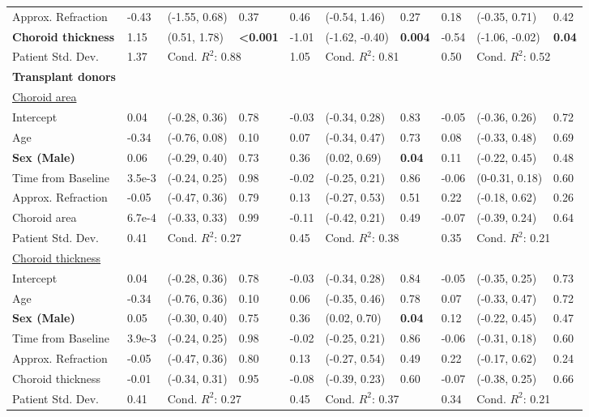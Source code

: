 {\begin{tabular}{llllllllll}
Approx. Refraction & -0.43 & (-1.55, 0.68) & 0.37 & 0.46 & (-0.54, 1.46) & 0.27 & 0.18 & (-0.35, 0.71) & 0.42 \\
\textbf{Choroid thickness} & 1.15 & (0.51, 1.78) & \textbf{<0.001} & -1.01 & (-1.62, -0.40) & \textbf{0.004} & -0.54 & (-1.06, -0.02) & \textbf{0.04} \\
Patient Std. Dev. & 1.37 & \multicolumn{2}{l}{Cond. $R^2$: 0.88} & 1.05 & \multicolumn{2}{l}{Cond. $R^2$: 0.81} & 0.50 & \multicolumn{2}{l}{Cond. $R^2$: 0.52}\\
\midrule
\multicolumn{1}{c}{\multirow{2}{*}{\textbf{Transplant donors}}} &  &  &  &  &  &  &  &  &  \\
 &  &  &  &  &  &  &  &  \\

 \midrule
\underline{Choroid area} &  &  &  &  &  &  &  &  &  \\
Intercept & 0.04 & (-0.28, 0.36) & 0.78 & -0.03 & (-0.34, 0.28) & 0.83 & -0.05 & (-0.36, 0.26) & 0.72 \\
Age & -0.34 & (-0.76, 0.08) & 0.10 & 0.07 & (-0.34, 0.47) & 0.73 & 0.08 & (-0.33, 0.48) & 0.69 \\
\textbf{Sex (Male)} & 0.06 & (-0.29, 0.40) & 0.73 & 0.36 & (0.02, 0.69) & \textbf{0.04} & 0.11 & (-0.22, 0.45) & 0.48 \\
Time from Baseline & 3.5e-3 & (-0.24, 0.25) & 0.98 & -0.02 & (-0.25, 0.21) & 0.86 & -0.06 & (0-0.31, 0.18) & 0.60 \\
Approx. Refraction & -0.05 & (-0.47, 0.36) & 0.79 & 0.13 & (-0.27, 0.53) & 0.51 & 0.22 & (-0.18, 0.62) & 0.26 \\
Choroid area & 6.7e-4 & (-0.33, 0.33) & 0.99 & -0.11 & (-0.42, 0.21) & 0.49 & -0.07 & (-0.39, 0.24) & 0.64 \\
Patient Std. Dev. & 0.41 & \multicolumn{2}{l}{Cond. $R^2$: 0.27} & 0.45 & \multicolumn{2}{l}{Cond. $R^2$: 0.38} & 0.35 & \multicolumn{2}{l}{Cond. $R^2$: 0.21} \\
\midrule
\underline{Choroid thickness}& \multicolumn{3}{c}{} & \multicolumn{3}{c}{} & \multicolumn{3}{c}{} \\
Intercept & 0.04 & (-0.28, 0.36) & 0.78 & -0.03 & (-0.34, 0.28) & 0.84 & -0.05 & (-0.35, 0.25) & 0.73 \\
Age & -0.34 & (-0.76, 0.36) & 0.10 & 0.06 & (-0.35, 0.46) & 0.78 & 0.07 & (-0.33, 0.47) & 0.72 \\
\textbf{Sex (Male)} & 0.05 & (-0.30, 0.40) & 0.75 & 0.36 & (0.02, 0.70) & \textbf{0.04} & 0.12 & (-0.22, 0.45) & 0.47 \\
Time from Baseline & 3.9e-3 & (-0.24, 0.25) & 0.98 & -0.02 & (-0.25, 0.21) & 0.86 & -0.06 & (-0.31, 0.18) & 0.60 \\
Approx. Refraction & -0.05 & (-0.47, 0.36) & 0.80 & 0.13 & (-0.27, 0.54) & 0.49 & 0.22 & (-0.17, 0.62) & 0.24 \\
Choroid thickness & -0.01 & (-0.34, 0.31) & 0.95 & -0.08 & (-0.39, 0.23) & 0.60 & -0.07 & (-0.38, 0.25) & 0.66 \\
Patient Std. Dev. & 0.41 & \multicolumn{2}{l}{Cond. $R^2$: 0.27} & 0.45 & \multicolumn{2}{l}{Cond. $R^2$: 0.37} & 0.34 & \multicolumn{2}{l}{Cond. $R^2$: 0.21} \\
\bottomrule

\end{tabular}}

